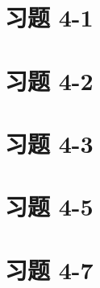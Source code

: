 \documentclass[UTF8,12pt,a4paper]{ctexart} %
\begin{document}
\section*{习题 4-1}



\section*{习题 4-2}



\section*{习题 4-3}



\section*{习题 4-5}



\section*{习题 4-7}


\end{document}
